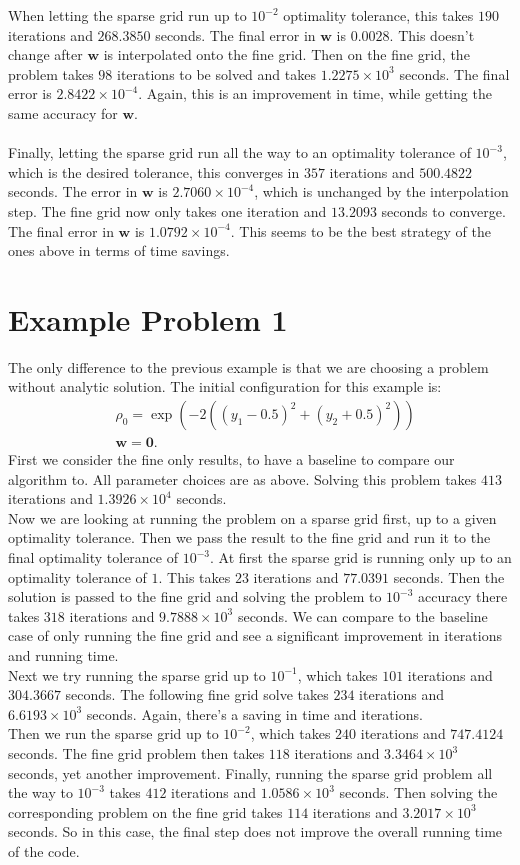 \documentclass[11pt, a4paper]{article}
\theoremstyle{definition}
\newcommand{\w}{\mathbf{w}}
\begin{document}
When letting the sparse grid run up to $10^{-2}$ optimality tolerance, this takes $190$ iterations and $268.3850$ seconds. The final error in $\w$ is $0.0028$. This doesn't change after $\w$ is interpolated onto the fine grid.
Then on the fine grid, the problem takes $98$ iterations to be solved and takes $1.2275 \times 10^3$ seconds. The final error is $2.8422 \times 10^{-4}$. Again, this is an improvement in time, while getting the same accuracy for $\w$.\\
\\
Finally, letting the sparse grid run all the way to an optimality tolerance of $10^{-3}$, which is the desired tolerance, this converges in $357$ iterations and $500.4822$ seconds. The error in $\w$ is $2.7060 \times 10^{-4}$, which is unchanged by the interpolation step. The fine grid now only takes one iteration and $13.2093$ seconds to converge. The final error in $\w$ is $1.0792 \times 10^{-4}$. This seems to be the best strategy of the ones above in terms of time savings.
	
\section{Example Problem 1}
The only difference to the previous example is that we are choosing a problem without analytic solution.
The initial configuration for this example is:
\begin{align*}
&\rho_0 = \exp(-2((y_1 - 0.5 )^2 + (y_2 + 0.5)^2))\\
&\w = \mathbf 0.
\end{align*}
First we consider the fine only results, to have a baseline to compare our algorithm to. All parameter choices are as above. Solving this problem takes $413$ iterations and $1.3926 \times 10^4$ seconds.\\
Now we are looking at running the problem on a sparse grid first, up to a given optimality tolerance. Then we pass the result to the fine grid and run it to the final optimality tolerance of $10^{-3}$. At first the sparse grid is running only up to an optimality tolerance of $1$. This takes $23$ iterations and $77.0391$ seconds. Then the solution is passed to the fine grid and solving the problem to $10^{-3}$ accuracy there takes $318$ iterations and $9.7888 \times 10^3$ seconds. We can compare to the baseline case of only running the fine grid and see a significant improvement in iterations and running time.
\\
Next we try running the sparse grid up to $10^{-1}$, which takes $101 $ iterations and $304.3667$ seconds. The following fine grid solve takes $234$ iterations and $6.6193 \times 10^3$ seconds. Again, there's a saving in time and iterations.\\
Then we run the sparse grid up to $10^{-2}$, which takes $240$ iterations and $747.4124$ seconds. The fine grid problem then takes $118$ iterations and $3.3464 \times 10^3$ seconds, yet another improvement. 
Finally, running the sparse grid problem all the way to $10^{-3}$ takes $412$ iterations and $1.0586 \times 10^3$ seconds. Then solving the corresponding problem on the fine grid takes $114$ iterations and $3.2017 \times 10^3$ seconds. So in this case, the final step does not improve the overall running time of the code. 
\end{document}
